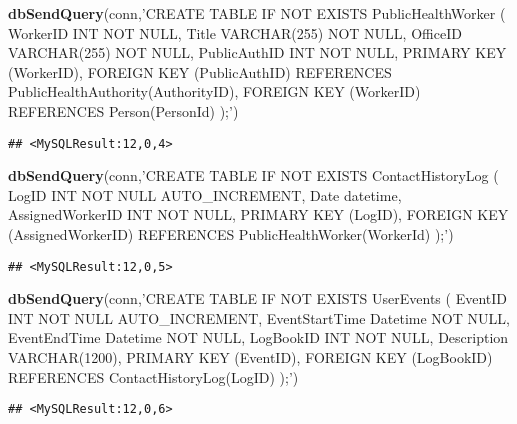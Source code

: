 \documentclass[
]{article}
\newenvironment{Shaded}{\begin{snugshade}}{\end{snugshade}}
\newcommand{\KeywordTok}[1]{\textcolor[rgb]{0.13,0.29,0.53}{\textbf{#1}}}
\newcommand{\NormalTok}[1]{#1}
\newcommand{\StringTok}[1]{\textcolor[rgb]{0.31,0.60,0.02}{#1}}
\begin{document}
\begin{Shaded}
\begin{Highlighting}[]
\KeywordTok{dbSendQuery}\NormalTok{(conn,}\StringTok{'CREATE TABLE IF NOT EXISTS PublicHealthWorker (}
\StringTok{  WorkerID INT NOT NULL, }
\StringTok{  Title VARCHAR(255) NOT NULL, }
\StringTok{  OfficeID VARCHAR(255) NOT NULL, }
\StringTok{  PublicAuthID INT NOT NULL,}
\StringTok{  PRIMARY KEY (WorkerID),}
\StringTok{  FOREIGN KEY (PublicAuthID) REFERENCES PublicHealthAuthority(AuthorityID),}
\StringTok{  FOREIGN KEY (WorkerID) REFERENCES Person(PersonId)}
\StringTok{);'}\NormalTok{)}
\end{Highlighting}
\end{Shaded}

\begin{verbatim}
## <MySQLResult:12,0,4>
\end{verbatim}

\begin{Shaded}
\begin{Highlighting}[]
\KeywordTok{dbSendQuery}\NormalTok{(conn,}\StringTok{'CREATE TABLE IF NOT EXISTS ContactHistoryLog (}
\StringTok{  LogID INT NOT NULL AUTO_INCREMENT, }
\StringTok{  Date datetime, }
\StringTok{  AssignedWorkerID INT NOT NULL, }
\StringTok{  PRIMARY KEY (LogID), }
\StringTok{  FOREIGN KEY (AssignedWorkerID) REFERENCES PublicHealthWorker(WorkerId)}
\StringTok{);'}\NormalTok{)}
\end{Highlighting}
\end{Shaded}

\begin{verbatim}
## <MySQLResult:12,0,5>
\end{verbatim}

\begin{Shaded}
\begin{Highlighting}[]
\KeywordTok{dbSendQuery}\NormalTok{(conn,}\StringTok{'CREATE TABLE IF NOT EXISTS UserEvents (}
\StringTok{  EventID INT NOT NULL AUTO_INCREMENT, }
\StringTok{  EventStartTime Datetime NOT NULL, }
\StringTok{  EventEndTime Datetime NOT NULL,}
\StringTok{  LogBookID INT NOT NULL,}
\StringTok{  Description VARCHAR(1200), }
\StringTok{  PRIMARY KEY (EventID),}
\StringTok{  FOREIGN KEY (LogBookID) REFERENCES ContactHistoryLog(LogID)}
\StringTok{);'}\NormalTok{)}
\end{Highlighting}
\end{Shaded}

\begin{verbatim}
## <MySQLResult:12,0,6>
\end{verbatim}
\end{document}
